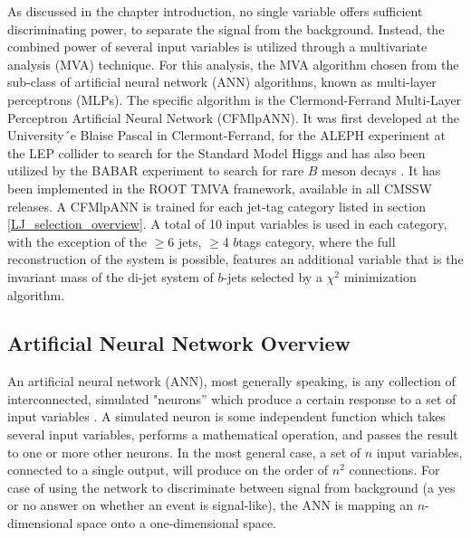 \par As discussed in the chapter introduction, no single variable
offers sufficient discriminating power, to separate the \ttH signal
from the \ttjets background.  Instead, the combined power of several
input variables is utilized through a multivariate analysis (MVA)
technique.  For this analysis, the MVA algorithm chosen from the sub-class
of artificial neural network (ANN) algorithms, known as multi-layer
perceptrons (MLPs).  The specific algorithm is the Clermond-Ferrand
Multi-Layer Perceptron Artificial Neural Network (CFMlpANN).  It was
first developed at the University´e Blaise Pascal in Clermont-Ferrand,
for the ALEPH experiment at the LEP collider to search for the
Standard Model Higgs and has also been utilized by the BABAR
experiment to search for rare $B$ meson decays \cite{Hocker:2007ht}.
It has been implemented in the ROOT TMVA framework, available in all
CMSSW releases.  A CFMlpANN is trained for each jet-tag category
listed in section \ref{LJ_selection_overview}.  A total of 10 input
variables is used in each category, with the exception of the $\ge$6
jets, $\ge$4 $b$tags category, where the full reconstruction of the
\ttH system is possible, features an additional variable that is the
invariant mass of the di-jet system of $b$-jets selected by a
$\chi^{2}$ minimization algorithm.  

\subsection{Artificial Neural Network Overview}
\label{ann_overview}

\par An artificial neural network (ANN), most generally speaking, is
any collection of interconnected, simulated "neurons'' which produce a
certain response to a set of input variables \cite{Hocker:2007ht}.  A
simulated neuron is some independent function which takes several
input variables, performs a mathematical operation, and passes the
result to one or more other neurons.  In the most general case, a set
of $n$ input variables, connected to a single output, will produce on
the order of $n^{2}$ connections.  For case of using the network to
discriminate between signal from background (a yes or no answer on
whether an event is signal-like), the ANN is mapping an
$n$-dimensional space onto a one-dimensional space.  

